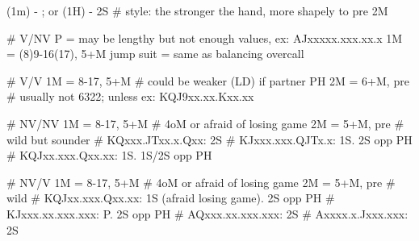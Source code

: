 (1m) - ; or (1H) - 2S
# style: the stronger the hand, more shapely to pre 2M

# V/NV 
P  = may be lengthy but not enough values, ex: AJxxxxx.xxx.xx.x
1M = (8)9-16(17), 5+M
jump suit = same as balancing overcall

# V/V
1M = 8-17, 5+M  # could be weaker (LD) if partner PH
2M = 6+M, pre  # usually not 6322; unless ex: KQJ9xx.xx.Kxx.xx

# NV/NV
1M = 8-17, 5+M  # 4oM or afraid of losing game
2M = 5+M, pre  # wild but sounder
# KQxxx.JTxx.x.Qxx: 2S
# KJxxx.xxx.QJTx.x: 1S. 2S opp PH
# KQJxx.xxx.Qxx.xx: 1S. 1S/2S opp PH

# NV/V 
1M = 8-17, 5+M  # 4oM or afraid of losing game
2M = 5+M, pre  # wild
# KQJxx.xxx.Qxx.xx: 1S (afraid losing game). 2S opp PH
# KJxxx.xx.xxx.xxx: P. 2S opp PH
# AQxxx.xx.xxx.xxx: 2S
# Axxxx.x.Jxxx.xxx: 2S